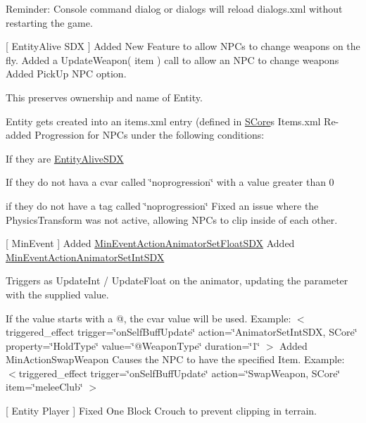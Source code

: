 Reminder\+: Console command dialog or dialogs will reload dialogs.\+xml without restarting the game.

\mbox{[} Entity\+Alive SDX \mbox{]} Added New Feature to allow NPCs to change weapons on the fly. Added a Update\+Weapon( item ) call to allow an NPC to change weapons Added Pick\+Up NPC option.
\begin{DoxyItemize}
\item This preserves ownership and name of Entity.
\item Entity gets created into an items.\+xml entry (defined in \mbox{\hyperlink{namespace_s_core}{SCore}}\textquotesingle{}s Items.\+xml Re-\/added Progression for NPCs under the following conditions\+:
\item If they are \mbox{\hyperlink{class_entity_alive_s_d_x}{Entity\+Alive\+SDX}}
\item If they do not hava a cvar called \char`\"{}noprogression\char`\"{} with a value greater than 0
\item if they do not have a tag called \char`\"{}noprogression\char`\"{} Fixed an issue where the Physics\+Transform was not active, allowing NPCs to clip inside of each other.
\end{DoxyItemize}

\mbox{[} Min\+Event \mbox{]} Added \mbox{\hyperlink{class_min_event_action_animator_set_float_s_d_x}{Min\+Event\+Action\+Animator\+Set\+Float\+SDX}} Added \mbox{\hyperlink{class_min_event_action_animator_set_int_s_d_x}{Min\+Event\+Action\+Animator\+Set\+Int\+SDX}}
\begin{DoxyItemize}
\item Triggers as Update\+Int / Update\+Float on the animator, updating the parameter with the supplied value.
\item If the value starts with a @, the cvar value will be used. Example\+: $<$triggered\+\_\+effect trigger=\char`\"{}on\+Self\+Buff\+Update\char`\"{} action=\char`\"{}\+Animator\+Set\+Int\+SDX, SCore\char`\"{} property=\char`\"{}\+Hold\+Type\char`\"{} value=\char`\"{}@\+Weapon\+Type\char`\"{} duration=\char`\"{}1\char`\"{} $>$ Added Min\+Action\+Swap\+Weapon Causes the NPC to have the specified Item. Example\+: $<$triggered\+\_\+effect trigger=\char`\"{}on\+Self\+Buff\+Update\char`\"{} action=\char`\"{}\+Swap\+Weapon, SCore\char`\"{} item=\char`\"{}melee\+Club\char`\"{} $>$
\end{DoxyItemize}

\mbox{[} Entity Player \mbox{]} Fixed One Block Crouch to prevent clipping in terrain.


